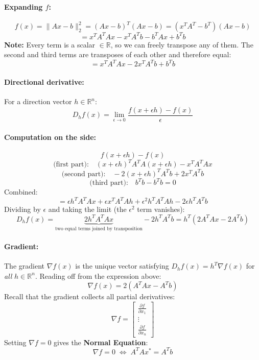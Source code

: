 \documentclass{article}
\begin{document}
\paragraph{Expanding $f$:}
\[
  f(x) = \|Ax-b\|_2^2 = (Ax-b)^T(Ax-b) = (x^TA^T - b^T)(Ax - b)
\]
\[
  = x^TA^TAx - x^TA^Tb - b^TAx + b^Tb
\]
\textbf{Note:} Every term is a scalar $\in \mathbb{R}$, so we can freely transpose any of them.
The second and third terms are transposes of each other and therefore equal:
\[
  = x^TA^TAx - 2x^TA^Tb + b^Tb
\]

\paragraph{Directional derivative:}
For a direction vector $h \in \mathbb{R}^n$:
\[
  D_h f(x) = \lim_{\epsilon \to 0} \frac{f(x + \epsilon h) - f(x)}{\epsilon}
\]

\paragraph{Computation on the side:}
\[
  f(x + \epsilon h) - f(x)
\]
\[
  \text{(first part):}\quad (x+\epsilon h)^T A^TA(x+\epsilon h) - x^TA^TAx
\]
\[
  \text{(second part):}\quad -2(x+\epsilon h)^TA^Tb + 2x^TA^Tb
\]
\[
  \text{(third part):}\quad b^Tb - b^Tb = 0
\]
Combined:
\[
  = \epsilon h^TA^TAx + \epsilon x^TA^TAh + \epsilon^2 h^TA^TAh - 2\epsilon h^TA^Tb
\]
Dividing by $\epsilon$ and taking the limit (the $\epsilon^2$ term vanishes):
\[
  D_h f(x) = \underbrace{2h^TA^TAx}_{\text{two equal terms joined by transposition}}
             - 2h^TA^Tb = h^T\!\left(2A^TAx - 2A^Tb\right)
\]

\paragraph{Gradient:}
The gradient $\nabla f(x)$ is the unique vector satisfying $D_h f(x) = h^T \nabla f(x)$
for \emph{all} $h \in \mathbb{R}^n$. Reading off from the expression above:
\[
  \nabla f(x) = 2(A^TAx - A^Tb)
\]
Recall that the gradient collects all partial derivatives:
\[
  \nabla f = \begin{bmatrix} \tfrac{\partial f}{\partial x_1} \\ \vdots \\
             \tfrac{\partial f}{\partial x_n} \end{bmatrix}
\]
Setting $\nabla f = 0$ gives the \textbf{Normal Equation}:
\[
  \nabla f = 0 \;\Longleftrightarrow\; A^TAx^* = A^Tb
\]
\end{document}
